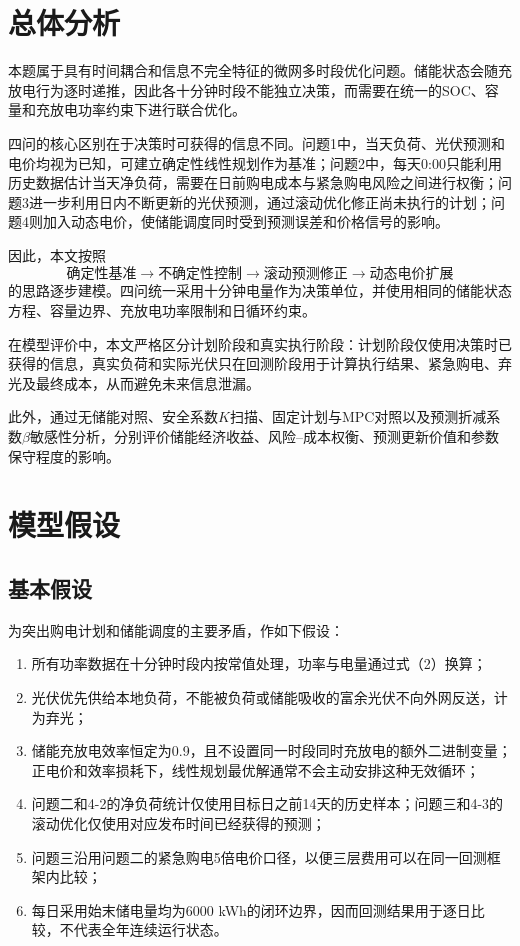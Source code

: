 \documentclass{cumcmthesis}
\begin{document}
\section{总体分析}

本题属于具有时间耦合和信息不完全特征的微网多时段优化问题。储能状态会随充放电行为逐时递推，因此各十分钟时段不能独立决策，而需要在统一的SOC、容量和充放电功率约束下进行联合优化。

四问的核心区别在于决策时可获得的信息不同。问题1中，当天负荷、光伏预测和电价均视为已知，可建立确定性线性规划作为基准；问题2中，每天0:00只能利用历史数据估计当天净负荷，需要在日前购电成本与紧急购电风险之间进行权衡；问题3进一步利用日内不断更新的光伏预测，通过滚动优化修正尚未执行的计划；问题4则加入动态电价，使储能调度同时受到预测误差和价格信号的影响。

因此，本文按照
\[
\text{确定性基准}
\longrightarrow
\text{不确定性控制}
\longrightarrow
\text{滚动预测修正}
\longrightarrow
\text{动态电价扩展}
\]
的思路逐步建模。四问统一采用十分钟电量作为决策单位，并使用相同的储能状态方程、容量边界、充放电功率限制和日循环约束。

在模型评价中，本文严格区分计划阶段和真实执行阶段：计划阶段仅使用决策时已获得的信息，真实负荷和实际光伏只在回测阶段用于计算执行结果、紧急购电、弃光及最终成本，从而避免未来信息泄漏。

此外，通过无储能对照、安全系数$K$扫描、固定计划与MPC对照以及预测折减系数$\beta$敏感性分析，分别评价储能经济收益、风险--成本权衡、预测更新价值和参数保守程度的影响\cite{boyd2004}。

\section{模型假设}

\subsection{基本假设}

为突出购电计划和储能调度的主要矛盾，作如下假设：
\begin{enumerate}
    \item 所有功率数据在十分钟时段内按常值处理，功率与电量通过式（2）换算；
    \item 光伏优先供给本地负荷，不能被负荷或储能吸收的富余光伏不向外网反送，计为弃光；
    \item 储能充放电效率恒定为0.9，且不设置同一时段同时充放电的额外二进制变量；正电价和效率损耗下，线性规划最优解通常不会主动安排这种无效循环；
    \item 问题二和4-2的净负荷统计仅使用目标日之前14天的历史样本；问题三和4-3的滚动优化仅使用对应发布时间已经获得的预测；
    \item 问题三沿用问题二的紧急购电5倍电价口径，以便三层费用可以在同一回测框架内比较；
    \item 每日采用始末储电量均为6000 kWh的闭环边界，因而回测结果用于逐日比较，不代表全年连续运行状态。
\end{enumerate}
\end{document}

